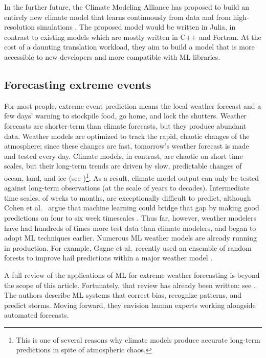 \documentclass[11pt]{report}
\begin{document}
In the further future, the Climate Modeling Alliance has proposed to build an entirely new climate model that learns continuously from data and from high-resolution simulations \cite{Schneider2017}. The proposed model would be written in Julia, in contrast to existing models which are mostly written in C++ and Fortran. At the cost of a daunting translation workload, they aim to build a model that is more accessible to new developers and more compatible with ML libraries.

\subsection{Forecasting extreme events}
\label{sec:models-extreme-events}
For most people, extreme event prediction means the local weather forecast and a few days' warning to stockpile food, go home, and lock the shutters.
Weather forecasts are shorter-term than climate forecasts, but they produce abundant data. Weather models are optimized to track the rapid, chaotic changes of the atmosphere; since these changes are fast, tomorrow's weather forecast is made and tested every day. Climate models, in contrast, are chaotic on short time scales, but their long-term trends are driven by slow, predictable changes of ocean, land, and ice (see \cite{Shukla1998})\footnote{This is one of several reasons why climate models produce accurate long-term predictions in spite of atmospheric chaos.}. As a result, climate model output can only be tested against long-term observations (at the scale of years to decades).  Intermediate time scales, of weeks to months, are exceptionally difficult to predict, although Cohen et al.~\cite{Cohen2018} argue that machine learning could bridge that gap by making good predictions on four to six week timescales \cite{Hwang2019}. Thus far, however, weather modelers have had hundreds of times more test data than climate modelers, and began to adopt ML techniques earlier. Numerous ML weather models are already running in production. For example, Gagne et al.~recently used an ensemble of random forests to improve hail predictions within a major weather model \cite{Gagne2017}. 

A full review of the applications of ML for extreme weather forecasting is beyond the scope of this article. Fortunately, that review has already been written: see \cite{McGovern2017using}.
The authors describe ML systems that correct bias, recognize patterns, and predict storms. Moving forward, they envision human experts working alongside automated forecasts.
\end{document}
